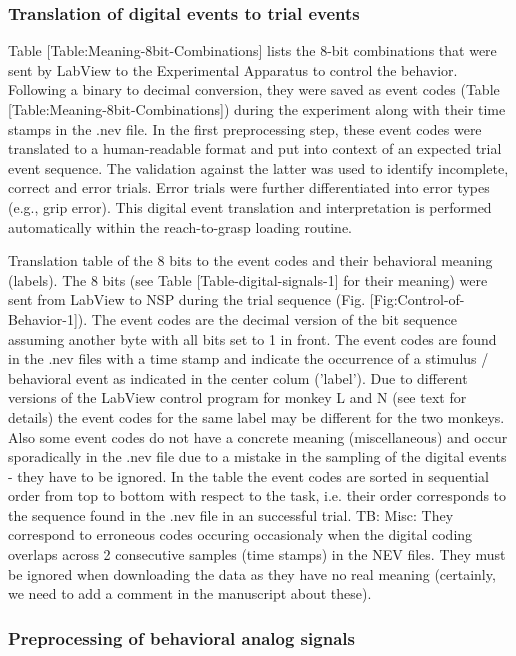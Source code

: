 {\subsubsection{Translation of digital events to trial events }

Table [Table:Meaning-8bit-Combinations] lists the 8-bit combinations that were sent by LabView to the Experimental Apparatus to control the behavior. Following a binary to decimal conversion, they were saved as event codes (Table [Table:Meaning-8bit-Combinations]) during the experiment along with their time stamps in the .nev file. In the first preprocessing step, these event codes were translated to a human-readable format and put into context of an expected trial event sequence. The validation against the latter was used to identify incomplete, correct and error trials. Error trials were further differentiated into error types (e.g., grip error). This digital event translation and interpretation is performed automatically within the reach-to-grasp loading routine. 

Translation table of the 8 bits to the event codes and their behavioral meaning (labels). The 8 bits (see Table [Table-digital-signals-1] for their meaning) were sent from LabView to NSP during the trial sequence (Fig. [Fig:Control-of-Behavior-1]). The event codes are the decimal version of the bit sequence assuming another byte with all bits set to 1 in front. The event codes are found in the .nev files with a time stamp and indicate the occurrence of a stimulus / behavioral event as indicated in the center colum ('label'). Due to different versions of the LabView control program for monkey L and N (see text for details) the event codes for the same label may be different for the two monkeys. Also some event codes do not have a concrete meaning (miscellaneous) and occur sporadically in the .nev file due to a mistake in the sampling of the digital events - they have to be ignored. In the table the event codes are sorted in sequential order from top to bottom with respect to the task, i.e. their order corresponds to the sequence found in the .nev file in an successful trial. TB: Misc: They correspond to erroneous codes occuring occasionaly when the digital coding overlaps across 2 consecutive samples (time stamps) in the NEV files. They must be ignored when downloading the data as they have no real meaning (certainly, we need to add a comment in the manuscript about these). 

\subsubsection{Preprocessing of behavioral analog signals}

}
